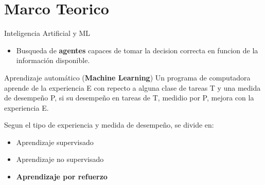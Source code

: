 \section{Marco Teorico}

\begin{frame}{Inteligencia Artificial y ML}
  \begin{itemize}
    \item Busqueda de \textbf{agentes} capaces de tomar la decision correcta en funcion de la información disponible.
  \end{itemize}

  \begin{block}{Aprendizaje automático (\textbf{Machine Learning})}
    Un programa de computadora aprende de la experiencia E con repecto a alguna clase de tareas T y una medida de desempeño P, si su desempeño en tareas de T, medidio por P, mejora con la experiencia E.
  \end{block}
  Segun el tipo de experiencia y medida de desempeño, se divide en:
  
    \begin{itemize}
      \item Aprendizaje supervisado
      \item Aprendizaje no supervisado
      \item \textbf{Aprendizaje por refuerzo}
    \end{itemize}
\end{frame}

